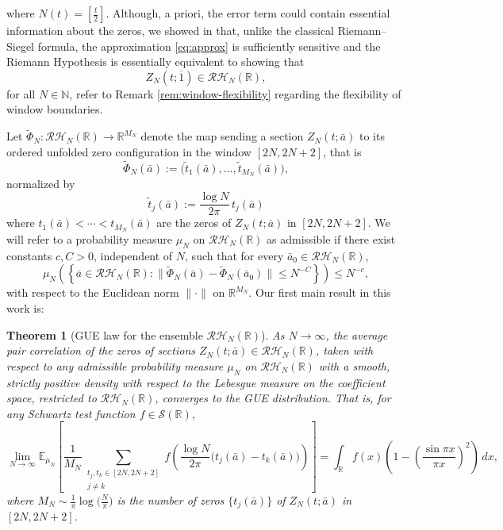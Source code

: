 \documentclass[12pt,reqno]{amsart}
\theoremstyle{plain}
\newtheorem{mainthm}{Theorem}
\theoremstyle{definition}
\theoremstyle{remark}
\begin{document}
where $N(t) = \left [ \frac{t}{2} \right]$. Although, a priori, the error term could contain essential information about the zeros, we showed in \cite{J,J5,J3} that, unlike the classical Riemann–Siegel formula, the approximation \eqref{eq:approx} is sufficiently sensitive and the Riemann Hypothesis is essentially equivalent to showing that
\begin{equation}
Z_N(t;\overline{1})\in\mathcal{RH}_N(\mathbb{R}),
\end{equation}
for all $N \in \mathbb{N}$, refer to Remark \ref{rem:window-flexibility} regarding the flexibility of window boundaries.  

Let $\widetilde{\Phi}_N:\mathcal{RH}_N(\mathbb{R})\to\mathbb{R}^{M_N}$ denote the map sending a section $Z_N(t;\bar a)$ to its ordered unfolded zero configuration in the
window $[2N,2N+2]$, that is 
\begin{equation}
\widetilde{\Phi}_N(\bar a):=\bigl(\widetilde t_1(\bar a),\dots,\widetilde t_{M_N}(\bar a)\bigr),
\end{equation}
normalized by 
\begin{equation}
\widetilde t_j(\bar a):=\frac{\log N}{2\pi}\,t_j(\bar a)
\end{equation}
where $t_1(\bar a)<\cdots<t_{M_N}(\bar a)$ are the zeros of $Z_N(t;\bar a)$ in $[2N,2N+2]$. We will refer to a probability measure $\mu_N$ on $\mathcal{RH}_N(\mathbb{R})$ as admissible if
there exist constants $c,C>0$, independent of $N$, such that for every $\bar a_0\in\mathcal{RH}_N(\mathbb{R})$,
\begin{equation}\label{eq:admissible}
\mu_N\!\left(\left\{\bar a\in\mathcal{RH}_N(\mathbb{R}) :
\bigl\|\widetilde{\Phi}_N(\bar a)-\widetilde{\Phi}_N(\bar a_0)\bigr\|\le N^{-C}\right\}\right)
\le N^{-c},
\end{equation}
with respect to the Euclidean norm  $\|\cdot\|$ on $\mathbb{R}^{M_N}$. Our first main result in this work is:

\begin{mainthm}[GUE law for the ensemble $\mathcal{RH}_N(\mathbb{R})$]\label{thm:A}
As \(N \to \infty\), the average pair
correlation of the zeros of sections 
\(Z_N(t;\bar a) \in \mathcal{RH}_N(\mathbb{R})\), taken with respect to 
any admissible probability measure $\mu_N$ on
$\mathcal{RH}_N(\mathbb{R})$ with a smooth, strictly positive density
with respect to the Lebesgue measure on the coefficient space, restricted
to $\mathcal{RH}_N(\mathbb{R})$, converges to the GUE distribution. That is, for any Schwartz test 
function \(f \in \mathcal{S}(\mathbb{R})\),
\begin{equation}\label{eq:GUE-ensemble}
\lim_{N\to\infty}
\mathbb{E}_{\mu_N}\!\left[
\frac{1}{M_N}
\sum_{\substack{t_j,t_k\in[2N,2N+2]\\ j\ne k}}
f\!\left(\frac{\log N}{2\pi}\bigl(t_j(\bar a)-t_k(\bar a)\bigr)\right)
\right]
=
\int_{\mathbb{R}} f(x)
\left(1-\left(\frac{\sin\pi x}{\pi x}\right)^2\right)\,dx,
\end{equation}
where \(M_N \sim \tfrac{1}{\pi}\log\!\bigl(\tfrac{N}{\pi}\bigr)\) is the 
number of zeros \(\{t_j(\bar a)\}\) of \(Z_N(t;\bar a)\) in \([2N,2N+2]\).
\end{mainthm}
\end{document}
